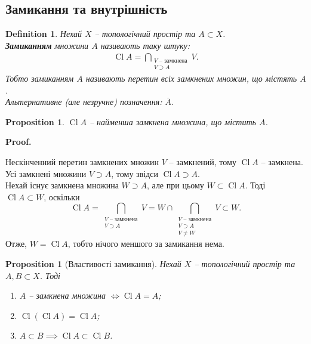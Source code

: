 \documentclass[a4paper, 10pt]{article}
\makeatletter
\theoremstyle{theoremdd}
\newtheorem{definition}[theorem]{Definition}
\newtheorem{proposition}[theorem]{Proposition}
\DeclareMathOperator{\Cl}{Cl}
\renewenvironment{proof}[1][Proof.\\]{\par
\pushQED{\hfill \qed}%
\normalfont \topsep6\p@\@plus6\p@\relax
\trivlist
\item\relax
{\bfseries
#1\@addpunct{.}}\hspace\labelsep\ignorespaces
}{%
\popQED\endtrivlist\@endpefalse
}
\makeatother
\begin{document}
\subsection{Замикання та внутрішність}
\begin{definition}
Нехай $X$ -- топологічний простір та $A \subset X$.\\
\textbf{Замиканням} множини $A$ називають таку штуку:
\begin{align*}
\Cl A = \bigcap_{\substack{\text{$V$ -- замкнена} \\ V \supset A}} V.
\end{align*}
Тобто замиканням $A$ називають перетин всіх замкнених множин, що містять $A$.\\
Альтернативне (\textit{але незручне}) позначення: $\overline{A}$.
\end{definition}

\begin{proposition}
$\Cl A$ -- найменша замкнена множина, що містить $A$.
\end{proposition}

\begin{proof}
Нескінченний перетин замкнених множин $V$ -- замкнений, тому $\Cl A$ -- замкнена.\\
Усі замкнені множини $V \supset A$, тому звідси $\Cl A \supset A$.\\
Нехай існує замкнена множина $W \supset A$, але при цьому $W \subset \Cl A$. Тоді $\Cl A \subset W$, оскільки
\[
\Cl A = \displaystyle\bigcap_{\substack{\text{$V$ -- замкнена} \\ V \supset A}} V = W \cap \bigcap_{\substack{\text{$V$ -- замкнена} \\ V \supset A \\ V \neq W}} V \subset W.
\]
Отже, $W = \Cl A$, тобто нічого меншого за замикання нема.
\end{proof}

\begin{proposition}[Властивості замикання]
Нехай $X$ -- топологічний простір та $A,B \subset X$. Тоді
\begin{enumerate}[nosep,wide=0pt,label={\arabic*)}]
\item $A$ -- замкнена множина $\iff \Cl A = A$;
\item $\Cl(\Cl A) = \Cl A$;
\item $A \subset B \implies \Cl A \subset \Cl B$.
\end{enumerate}
\end{proposition}
\end{document}
